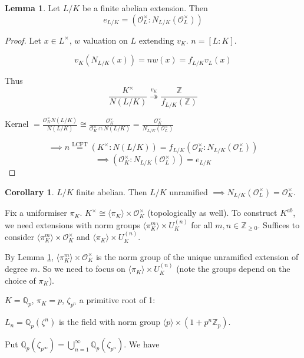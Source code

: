\documentclass[a4paper]{article}
\theoremstyle{definition}
\theoremstyle{default}
\newtheorem{lemma}[definition]{Lemma}
\newtheorem{corollary}[definition]{Corollary}
\theoremstyle{remark}
\DeclareMathOperator{\Gal}{Gal}
\DeclareMathOperator{\Art}{Art}
\begin{document}
\begin{lemma}
	Let $L/K$ be a finite abelian extension.
	Then $$e_{L/K} = (\mathcal{O}_L^\times : N_{L/K}(\mathcal{O}_L^\times))$$
	\label{108}
\end{lemma}
\begin{proof}
	Let $x \in L^\times$,
	$w$ valuation on $L$ extending $v_K$.
	$n=[L:K]$.
	
	$$v_K(N_{L/K}(x)) = nw(x) = f_{L/K} v_L(x)$$
	
	Thus $$\frac{K^\times}{N(L/K)} \overset{v_K}{\twoheadrightarrow} \frac{\mathbb{Z}}{f_{L/K}(\mathbb{Z})}$$
	
	Kernel $= \frac{\mathcal{O}_K^\times N(L/K)}{N(L/K)} \cong \frac{\mathcal{O}_K^\times}{\mathcal{O}_K^\times \cap N(L/K)} = \frac{\mathcal{O}_K^\times}{N_{L/K}(\mathcal{O}_L^\times)}$
	
	$$\implies n \overset{\text{LCFT}}{=} (K^\times: N(L/K)) = f_{L/K}(\mathcal{O}_K^\times : N_{L/K}(\mathcal{O}_L^\times))$$
	$$\implies (\mathcal{O}_K^\times: N_{L/K}(\mathcal{O}_L^\times)) = e_{L/K}$$
\end{proof}

\begin{corollary}
	$L/K$ finite abelian.
	Then $L/K$ unramified $\implies N_{L/K}(\mathcal{O}_L^\times) = \mathcal{O}_K^\times$.
\end{corollary}

Fix a uniformiser $\pi_K$.
$K^\times \cong \langle \pi_K \rangle \times \mathcal{O}_K^\times$ (topologically as well).
To construct $K^{ab}$,
we need extensions with norm groups $\langle \pi_K^m \rangle \times U_K^{(n)}$
for all $m,n \in \mathbb{Z}_{\geq 0}$.
Suffices to consider $\langle \pi_K^m \rangle \times \mathcal{O}_K^\times$ and $\langle \pi_K \rangle \times U_K^{(n)}$.

By Lemma \ref{108},
$\langle \pi_K^m \rangle \times \mathcal{O}_K^\times$ is the norm group of the unique unramified extension of degree $m$.
So we need to focus on $\langle \pi_K \rangle \times U_K^{(n)}$
(note the groups depend on the choice of $\pi_K$).

$K= \mathbb{Q}_p$, $\pi_K = p$, $\zeta_{p^n}$ a primitive root of 1:

$L_n = \mathbb{Q}_p(\zeta^n)$ is the field with norm group $\langle p \rangle \times (1+ p^n\mathbb{Z}_p)$.

Put $\mathbb{Q}_p(\zeta_{p^\infty}) = \bigcup_{n=1}^\infty \mathbb{Q}_p(\zeta_{p^n})$.
We have
\begin{center}
\end{center}
\end{document}

